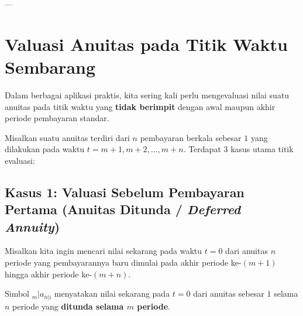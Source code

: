\documentclass[11pt,a4paper]{article}
\begin{document}
---

\section{Valuasi Anuitas pada Titik Waktu Sembarang}

Dalam berbagai aplikasi praktis, kita sering kali perlu mengevaluasi nilai suatu anuitas pada titik waktu yang \textbf{tidak berimpit} dengan awal maupun akhir periode pembayaran standar. 

Misalkan suatu anuitas terdiri dari $n$ pembayaran berkala sebesar $1$ yang dilakukan pada waktu $t = m+1, m+2, \dots, m+n$. Terdapat 3 kasus utama titik evaluasi:

\subsection{Kasus 1: Valuasi Sebelum Pembayaran Pertama (Anuitas Ditunda / \textit{Deferred Annuity})}

Misalkan kita ingin mencari nilai sekarang pada waktu $t = 0$ dari anuitas $n$ periode yang pembayarannya baru dimulai pada akhir periode ke-$(m+1)$ hingga akhir periode ke-$(m+n)$.

\begin{center}
\end{center}

\begin{definitionbox}
Simbol ${}_m| a_{\overline{n}|i}$ menyatakan nilai sekarang pada $t = 0$ dari anuitas sebesar $1$ selama $n$ periode yang \textbf{ditunda selama $m$ periode}.
\end{definitionbox}
\end{document}
